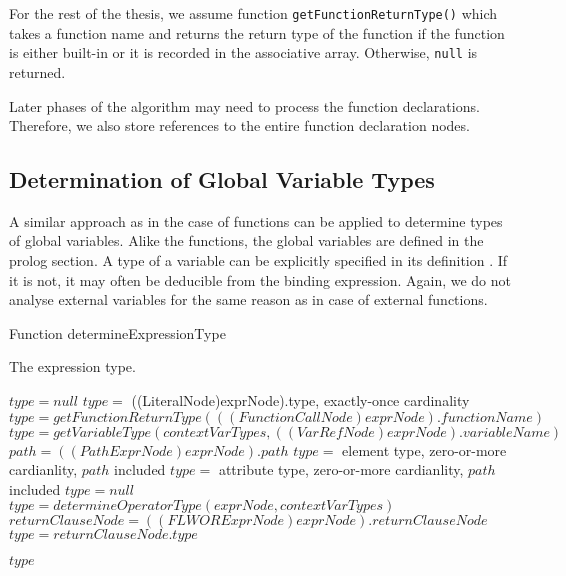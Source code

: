 For the rest of the thesis, we assume function  \texttt{getFunctionReturnType()} which takes a function name and returns the return type of the function if the function is either built-in or it is recorded in the associative array. Otherwise, \texttt{null} is returned.

Later phases of the algorithm may need to process the function declarations. Therefore, we also store references to the entire function declaration nodes.

\subsection{Determination of Global Variable Types}
A similar approach as in the case of functions can be applied to determine types of global variables. Alike the functions, the global variables are defined in the prolog section. A type of a variable can be explicitly specified in its definition . If it is not, it may often be deducible from the binding expression. Again, we do not analyse external variables for the same reason as in case of external functions.

\begin{algorithm}
\caption{Function determineExpressionType}
\label{ALG_func_determineExpressionType}
\begin{algorithmic}[1]
\ENSURE The expression type.

\STATE $type = null$
     \STATE $type =$ ((LiteralNode)exprNode).type, exactly-once cardinality
     \STATE $type = getFunctionReturnType(((FunctionCallNode)exprNode).functionName)$
     \STATE $type = getVariableType(contextVarTypes, ((VarRefNode)exprNode).variableName)$
     \STATE $path = ((PathExprNode)exprNode).path$
         \STATE $type =$ element type, zero-or-more cardianlity, $path$ included
         \STATE $type =$ attribute type, zero-or-more cardianlity, $path$ included
     \ELSE
         \STATE $type = null$
     \ENDIF
{}
     \STATE $type = determineOperatorType(exprNode, contextVarTypes)$
     \STATE $returnClauseNode = ((FLWORExprNode)exprNode).returnClauseNode$
     \STATE $type = returnClauseNode.type$
\ENDIF

\RETURN $type$
\end{algorithmic}
\end{algorithm}

